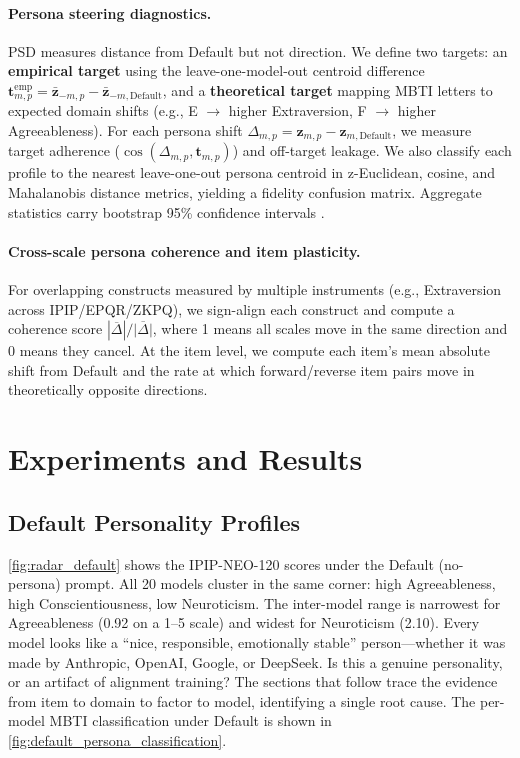 \documentclass[11pt]{article}
\begin{document}
\paragraph{Persona steering diagnostics.}
PSD measures distance from Default but not direction. We define two targets: an \textbf{empirical target} using the leave-one-model-out centroid difference $\mathbf{t}^{\mathrm{emp}}_{m,p} = \bar{\mathbf{z}}_{-m,p} - \bar{\mathbf{z}}_{-m,\mathrm{Default}}$, and a \textbf{theoretical target} mapping MBTI letters to expected domain shifts (e.g., E $\to$ higher Extraversion, F $\to$ higher Agreeableness). For each persona shift $\Delta_{m,p}=\mathbf{z}_{m,p}-\mathbf{z}_{m,\mathrm{Default}}$, we measure target adherence ($\cos(\Delta_{m,p}, \mathbf{t}_{m,p})$) and off-target leakage. We also classify each profile to the nearest leave-one-out persona centroid in z-Euclidean, cosine, and Mahalanobis \citep{mahalanobis1936generalised} distance metrics, yielding a fidelity confusion matrix. Aggregate statistics carry bootstrap 95\% confidence intervals \citep{efron1979bootstrap}.

\paragraph{Cross-scale persona coherence and item plasticity.}
For overlapping constructs measured by multiple instruments (e.g., Extraversion across IPIP/EPQR/ZKPQ), we sign-align each construct and compute a coherence score $|\overline{\Delta}|/\overline{|\Delta|}$, where 1 means all scales move in the same direction and 0 means they cancel. At the item level, we compute each item's mean absolute shift from Default and the rate at which forward/reverse item pairs move in theoretically opposite directions.

\section{Experiments and Results}

\subsection{Default Personality Profiles}

\cref{fig:radar_default} shows the IPIP-NEO-120 scores under the Default (no-persona) prompt. All 20 models cluster in the same corner: high Agreeableness, high Conscientiousness, low Neuroticism. The inter-model range is narrowest for Agreeableness (0.92 on a 1--5 scale) and widest for Neuroticism (2.10). Every model looks like a ``nice, responsible, emotionally stable'' person---whether it was made by Anthropic, OpenAI, Google, or DeepSeek. Is this a genuine personality, or an artifact of alignment training? The sections that follow trace the evidence from item to domain to factor to model, identifying a single root cause. The per-model MBTI classification under Default is shown in \cref{fig:default_persona_classification}.
\end{document}
